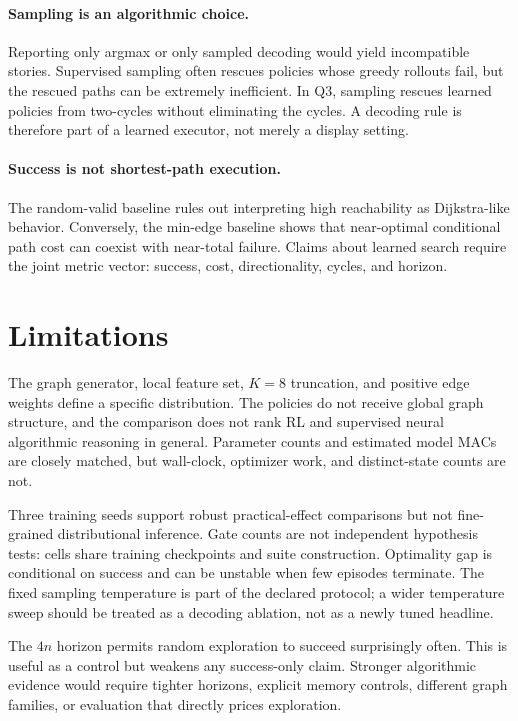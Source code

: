 \documentclass[10pt,twocolumn]{article}
\begin{document}
\paragraph{Sampling is an algorithmic choice.}
Reporting only argmax or only sampled decoding would yield incompatible
stories.  Supervised sampling often rescues policies whose greedy rollouts
fail, but the rescued paths can be extremely inefficient.  In Q3, sampling
rescues learned policies from two-cycles without eliminating the cycles.  A
decoding rule is therefore part of a learned executor, not merely a display
setting.

\paragraph{Success is not shortest-path execution.}
The random-valid baseline rules out interpreting high reachability as
Dijkstra-like behavior.  Conversely, the min-edge baseline shows that
near-optimal conditional path cost can coexist with near-total failure.  Claims
about learned search require the joint metric vector: success, cost,
directionality, cycles, and horizon.

\section{Limitations}

The graph generator, local feature set, $K=8$ truncation, and positive edge
weights define a specific distribution.  The policies do not receive global
graph structure, and the comparison does not rank RL and supervised neural
algorithmic reasoning in general.  Parameter counts and estimated model MACs
are closely matched, but wall-clock, optimizer work, and distinct-state counts
are not.

Three training seeds support robust practical-effect comparisons but not
fine-grained distributional inference.  Gate counts are not independent
hypothesis tests: cells share training checkpoints and suite construction.
Optimality gap is conditional on success and can be unstable when few episodes
terminate.  The fixed sampling temperature is part of the declared protocol;
a wider temperature sweep should be treated as a decoding ablation, not as a
newly tuned headline.

The $4n$ horizon permits random exploration to succeed surprisingly often.
This is useful as a control but weakens any success-only claim.  Stronger
algorithmic evidence would require tighter horizons, explicit memory controls,
different graph families, or evaluation that directly prices exploration.
\end{document}
